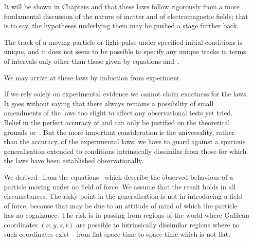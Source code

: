 \documentclass[12pt]{book}
\begin{document}
 It will be shown in Chapters  and  that these laws follow
rigorously from a more fundamental discussion of the nature of matter and
of electromagnetic fields; that is to say, the hypotheses underlying them may
be pushed a stage further back.

 The track of a moving particle or light-pulse under specified initial
conditions is unique, and it does not seem to be possible to specify any
unique tracks in terms of intervals only other than those given by equations
 and~.

 We may arrive at these laws by induction from experiment.

If we rely solely on experimental evidence we cannot claim exactness for
the laws. It goes without saying that there always remains a possibility of
small amendments of the laws too slight to affect any observational tests yet
tried. Belief in the perfect accuracy of  and  can only be justified
on the theoretical grounds  or~. But the more important consideration
is the universality, rather than the accuracy, of the experimental laws; we
have to guard against a spurious generalisation extended to conditions
intrinsically dissimilar from those for which the laws have been established
observationally.

We derived~ from the equations~ which describe the observed
behaviour of a particle moving under no field of force. We assume that the
result holds in all circumstances. The risky point in the generalisation is not
in introducing a field of force, because that may be due to an attitude of
mind of which the particle has no cognizance. The risk is in passing from
regions of the world where Galilean coordinates $(x, y, z, t)$ are possible to
intrinsically dissimilar regions where no such coordinates exist---from flat
space-time to space-time which is not flat.
\end{document}
